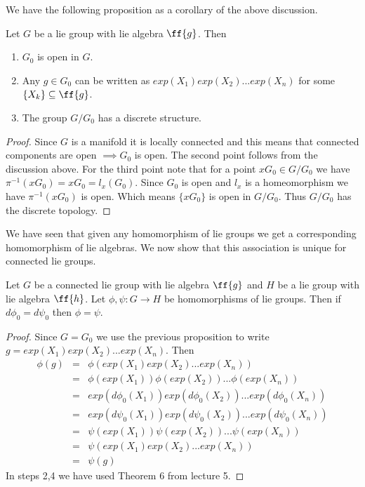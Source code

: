\documentclass{article}
\begin{document}
We have the following proposition as a corollary of the above discussion.

\begin{proposition}
    Let $G$ be a lie group with lie algebra $\ff{g}$. Then 
    \begin{enumerate}
        \item $G_0$ is open in $G$.
        \item Any $g\in G_0$ can be written as $exp(X_1)exp(X_2)...exp(X_n)$ for some $\{X_k\}\subseteq \ff{g}$.
        \item The group $G/G_0$ has a discrete structure.
    \end{enumerate}
\end{proposition}

\begin{proof}
    Since $G$ is a manifold it is locally connected and this means that connected components are open $\implies G_0$ is open. The second point follows from the discussion above. 
    For the third point note that for a point $xG_0\in G/G_0$ we have $\pi^{-1}(xG_0) = xG_0 = l_x(G_0)$. Since $G_0$ is open and $l_x$ is a homeomorphism we have $\pi^{-1}(xG_0)$ is open.
    Which means $\{xG_0\}$ is open in $G/G_0$. Thus $G/G_0$ has the discrete topology.
\end{proof}

We have seen that given any homomorphism of lie groups we get a corresponding homomorphism of lie algebras. We now show that this association is unique for connected lie groups.

\begin{proposition}
    Let $G$ be a connected lie group with lie algebra $\ff{g}$ and $H$ be a lie group with lie algebra $\ff{h}$. Let $\phi,\psi:G\to H$ be homomorphisms of lie groups. Then if 
    $d\phi_0 = d\psi_0$ then $\phi = \psi$.
\end{proposition}

\begin{proof}
    Since $G=G_0$ we use the previous proposition to write $g = exp(X_1)exp(X_2)...exp(X_n)$. Then 
    \begin{eqnarray*}
        \phi(g) &=& \phi(exp(X_1)exp(X_2)...exp(X_n))\\
        &=& \phi(exp(X_1))\phi(exp(X_2))...\phi(exp(X_n))\\
        &=& exp(d\phi_0(X_1))exp(d\phi_0(X_2))...exp(d\phi_0(X_n))\\
        &=& exp(d\psi_0(X_1))exp(d\psi_0(X_2))...exp(d\psi_0(X_n))\\
        &=& \psi(exp(X_1))\psi(exp(X_2))...\psi(exp(X_n))\\
        &=& \psi(exp(X_1)exp(X_2)...exp(X_n))\\
        &=& \psi(g)
    \end{eqnarray*}
    In steps 2,4 we have used Theorem 6 from lecture 5.
\end{proof}
\end{document}
